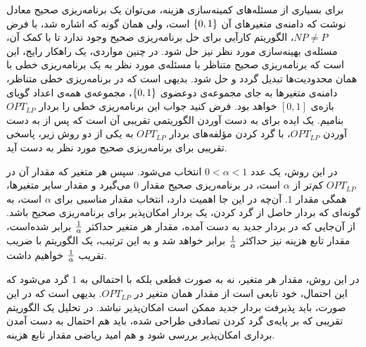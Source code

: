 
برای بسیاری از مسئله‌های کمینه‌سازی هزینه، می‌توان یک برنامه‌ریزی صحیح معادل نوشت که دامنه‌ی متغیر‌های آن ${\{ 0, 1 \}}$ است، ولی همان گونه که اشاره شد، با فرض $NP \neq P$، الگوریتم کارآیی برای حل برنامه‌ریزی صحیح وجود ندارد تا با کمک آن، مسئله‌ی بهینه‌سازی مورد نظر نیز حل شود. در چنین مواردی، یک راهکار رایج، این است که برنامه‌ریزی صحیح متناظر با مسئله‌ی مورد نظر به یک برنامه‌ریزی خطی با همان محدودیت‌ها تبدیل گردد و حل شود. بدیهی است که در برنامه‌ریزی خطی متناظر، دامنه‌ی متغیر‌ها به جای مجموعه‌ی دوعضوی ${\{ 0, 1 \}}$، مجموعه‌ی همه‌ی اعداد گویای بازه‌ی $[0, 1]$ خواهد بود. فرض کنید جواب این برنامه‌ریزی خطی را بردار $OPT_{LP}$ بنامیم. یک ایده برای به دست آوردن الگوریتمی تقریبی آن است که پس از به دست آوردن $OPT_{LP}$، با گرد کردن مؤلفه‌های بردار $OPT_{LP}$ به یکی از دو روش زیر، پاسخی تقریبی برای برنامه‌ریزی صحیح مورد نظر به دست آید.


 

در این روش، یک عدد $0 < \alpha < 1$ انتخاب می‌شود. سپس هر متغیر که مقدار آن در $OPT_{LP}$ کم‌تر از $\alpha$  است، در برنامه‌ریزی صحیح مقدار $0$ می‌گیرد و مقدار سایر متغیر‌ها، همگی مقدار $1$. آن‌چه در این جا اهمیت دارد، انتخاب مقدار مناسبی برای $\alpha$ است، به گونه‌ای که بردار حاصل از گرد کردن، یک بردار امکان‌پذیر برای برنامه‌ریزی صحیح باشد. از آن‌جایی که در بردار جدید به دست آمده، مقدار هر متغیر حد‌اکثر ${{1} \over {\alpha}}$ برابر شده‌است، مقدار تابع هزینه نیز حد‌اکثر ${{1} \over {\alpha}}$ برابر خواهد شد و به این ترتیب، یک الگوریتم با ضریب تقریب ${{1} \over {\alpha}}$ خواهیم داشت.

 

در این روش، مقدار هر متغیر، نه به صورت قطعی بلکه با احتمالی به $1$ گرد می‌شود که این احتمال، خود تابعی است از مقدار همان متغیر در $OPT_{LP}$. بدیهی است که در این صورت، باید پذیرفت بردار جدید ممکن است امکان‌پذیر نباشد. در تحلیل یک الگوریتم تقریبی که بر پایه‌ی گرد کردن تصادفی طراحی شده، باید هم احتمال به دست آمدن برداری امکان‌پذیر بررسی شود و هم امید ریاضی مقدار تابع هزینه.

